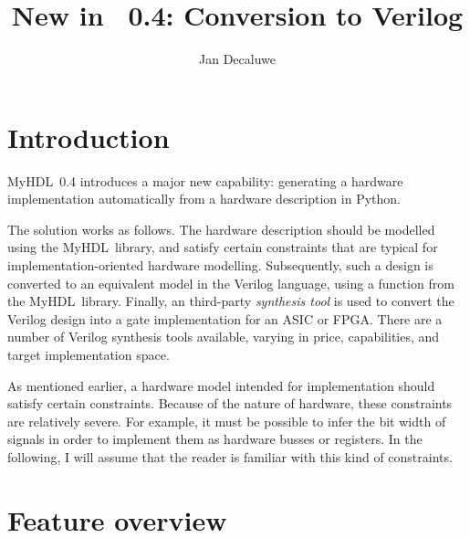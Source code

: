 \documentclass{howto}
\title{New in \myhdl\ 0.4: Conversion to Verilog}
\author{Jan Decaluwe}
\newcommand{\myhdl}{\protect \mbox{MyHDL}}
\begin{document}
\maketitle
\tableofcontents


\section{Introduction}

\myhdl\ 0.4 introduces a major new capability: 
generating a hardware implementation automatically
from a hardware description in Python. 

The solution works as follows. The hardware description should be
modelled using the \myhdl\ library, and satisfy certain constraints
that are typical for implementation-oriented hardware modelling.
Subsequently, such a design is converted to an equivalent model in the
Verilog language, using a function from the \myhdl\ library. Finally,
an third-party \emph{synthesis tool} is used to convert the Verilog
design into a gate implementation for an ASIC or FPGA. There are a
number of Verilog synthesis tools available, varying in price,
capabilities, and target implementation space.

As mentioned earlier, a hardware model intended for implementation
should satisfy certain constraints. Because of the nature of hardware,
these constraints are relatively severe.  For example,
it must be possible to infer the bit width of signals in order to
implement them as hardware busses or registers.  In the following, I
will assume that the reader is familiar with this kind of constraints.


\section{Feature overview\label{section-feature}}
\end{document}
